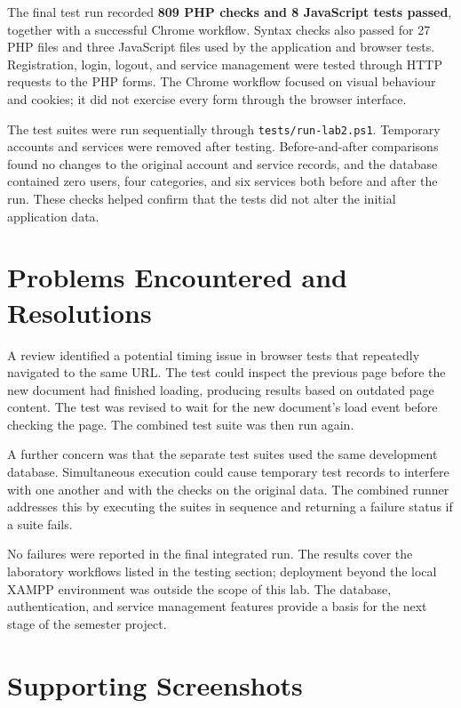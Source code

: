 \documentclass[11pt,a4paper]{article}
\newcommand{\code}[1]{{\small\nolinkurl{#1}}}
\begin{document}
The final test run recorded \textbf{809 PHP checks and 8 JavaScript tests
passed}, together with a successful Chrome workflow. Syntax checks also passed
for 27 PHP files and three JavaScript files used by the application and browser
tests. Registration, login, logout, and service management were tested through
HTTP requests to the PHP forms. The Chrome workflow focused on visual behaviour
and cookies; it did not exercise every form through the browser interface.

The test suites were run sequentially through \code{tests/run-lab2.ps1}.
Temporary accounts and services were removed after testing. Before-and-after
comparisons found no changes to the original account and service records, and
the database contained zero users, four categories, and six services both before
and after the run. These checks helped confirm that the tests did not alter the
initial application data.

\section{Problems Encountered and Resolutions}

A review identified a potential timing issue in browser tests that repeatedly
navigated to the same URL.
The test could inspect the previous page before the new document had finished
loading, producing results based on outdated page content. The test was revised
to wait for the new document's load event before checking the page. The combined
test suite was then run again.

A further concern was that the separate test suites used the same development
database. Simultaneous execution could cause temporary test records to
interfere with one another and with the checks on the original data. The
combined runner addresses this by executing the suites in sequence and returning
a failure status if a suite fails.

No failures were reported in the final integrated run. The results cover the
laboratory workflows listed in the testing section; deployment beyond the local
XAMPP environment was outside the scope of this lab. The database, authentication,
and service management features provide a basis for the next stage of the
semester project.

\clearpage
\appendix
\section{Supporting Screenshots}
\end{document}
